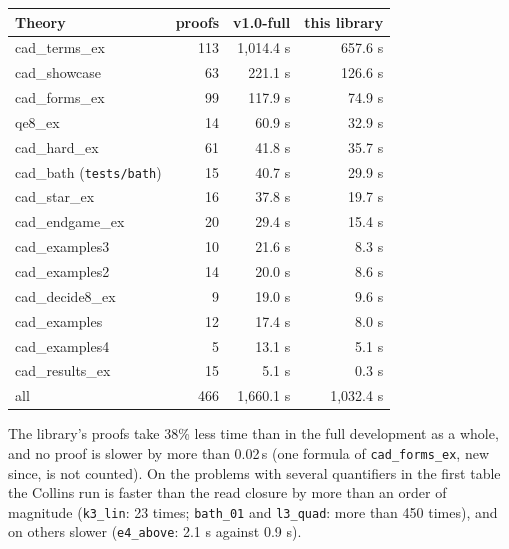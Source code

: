 \documentclass[11pt]{article}
\begin{document}
{\small
\begin{longtable}{@{}>{\ttfamily}p{} r r r@{}}
\toprule
\textsf{\small\bfseries Theory} & \textsf{\small\bfseries proofs} & \textsf{\small\bfseries v1.0-full} & \textsf{\small\bfseries this library}\\
\midrule
cad\_terms\_ex & 113 & 1,014.4 s & 657.6 s\\
cad\_showcase & 63 & 221.1 s & 126.6 s\\
cad\_forms\_ex & 99 & 117.9 s & 74.9 s\\
qe8\_ex & 14 & 60.9 s & 32.9 s\\
cad\_hard\_ex & 61 & 41.8 s & 35.7 s\\
cad\_bath (\texttt{tests/bath}) & 15 & 40.7 s & 29.9 s\\
cad\_star\_ex & 16 & 37.8 s & 19.7 s\\
cad\_endgame\_ex & 20 & 29.4 s & 15.4 s\\
cad\_examples3 & 10 & 21.6 s & 8.3 s\\
cad\_examples2 & 14 & 20.0 s & 8.6 s\\
cad\_decide8\_ex & 9 & 19.0 s & 9.6 s\\
cad\_examples & 12 & 17.4 s & 8.0 s\\
cad\_examples4 & 5 & 13.1 s & 5.1 s\\
cad\_results\_ex & 15 & 5.1 s & 0.3 s\\
\midrule
all & 466 & 1,660.1 s & 1,032.4 s\\
\bottomrule
\end{longtable}}

The library's proofs take 38\% less time than in the full development as a whole, and no proof is slower by more
than 0.02\,s (one formula of \texttt{cad\_forms\_ex}, new since, is not counted). On the problems with several quantifiers in the first table the Collins run is faster
than the read closure by more than an order of magnitude (\texttt{k3\_lin}: 23 times; \texttt{bath\_01} and
\texttt{l3\_quad}: more than 450 times), and on others slower (\texttt{e4\_above}: 2.1 s against 0.9 s).
\end{document}
